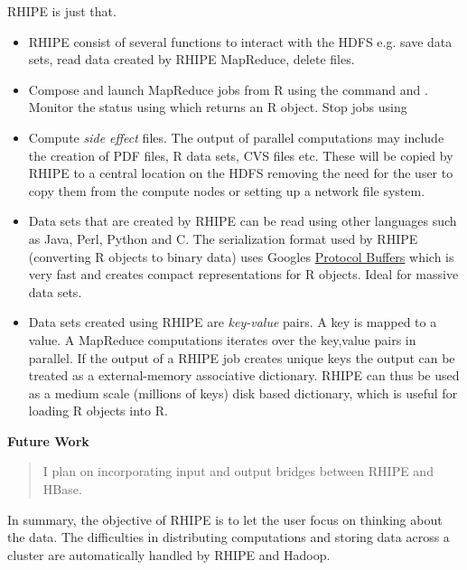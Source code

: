 \documentclass[letterpaper,10pt,english]{sphinxmanual}
\begin{document}
RHIPE is just that.
\begin{itemize}
\item {} 
RHIPE consist of several functions to interact with the HDFS e.g. save data
sets, read data created by RHIPE MapReduce, delete files.

\item {} 
Compose and launch MapReduce jobs from R using the command  and
. Monitor the status using  which returns an R
object. Stop jobs using 

\item {} 
Compute \emph{side effect} files. The output of parallel computations may include
the creation of PDF files, R data sets, CVS files etc. These will be copied by
RHIPE to a central location on the HDFS removing the need for the user to copy
them from the compute nodes or setting up a network file system.

\item {} 
Data sets that are created by RHIPE can be read using other languages such as
Java, Perl, Python and C. The serialization format used by RHIPE (converting R
objects to binary data) uses Googles \href{http://code.google.com/p/protobuf/}{Protocol Buffers} which is very fast and creates compact
representations for R objects. Ideal for massive data sets.

\item {} 
Data sets created using RHIPE are \emph{key-value} pairs. A key is mapped to a
value. A MapReduce computations iterates over the key,value pairs in
parallel. If the output of a RHIPE job creates unique keys the output can be
treated as a external-memory associative dictionary. RHIPE can thus be used as
a medium scale (millions of keys) disk based dictionary, which is useful for
loading R objects into R.

\end{itemize}

\textbf{Future Work}
\begin{quote}

I plan on incorporating input and output bridges between RHIPE and
HBase.
\end{quote}

In summary, the objective of RHIPE is to let the user focus on thinking about
the data. The difficulties in distributing computations and storing data across
a cluster are automatically handled by RHIPE and Hadoop.
\end{document}
